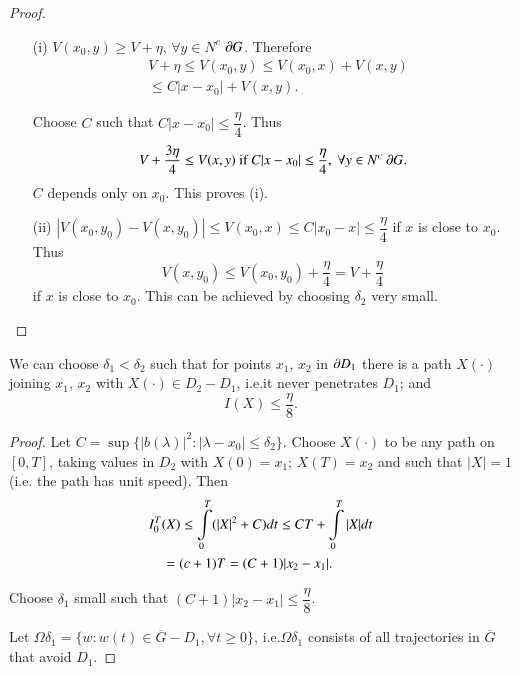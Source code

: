 \begin{proof}
\begin{itemize}
\item[\rm(i)] $V(x_{0},y)\geq V+\eta$, $\forall y\in N^{c}$ $\partial
  G$. Therefore
\begin{align*}
& V+\eta\leq V(x_{0},y)\leq V(x_{0},x)+V(x,y)\\
& \leq C|x-x_{0}|+V(x,y).
\end{align*}

Choose $C$ such that $C|x-x_{0}|\leq \dfrac{\eta}{4}$. Thus
$$
V+\frac{3\eta}{4}\leq V(x,y)\text{~ if~ } C|x-x_{0}|\leq
\frac{\eta}{4},\ \forall y\in N^{c}\ \partial G.
$$\pageoriginale
$C$ depends only on $x_{0}$. This proves (i).


\item[(ii)] $|V(x_{0},y_{0})-V(x,y_{0})|\leq V(x_{0},x)\leq
  C|x_{0}-x|\leq \dfrac{\eta}{4}$ if $x$ is close to $x_{0}$. Thus
$$
V(x,y_{0})\leq V(x_{0},y_{0})+\frac{\eta}{4}=V+\frac{\eta}{4}
$$
if $x$ is close to $x_{0}$. This can be achieved by choosing
$\delta_{2}$ very small.
\end{itemize}
\end{proof}

\begin{claim*}[(iii)]
We can choose $\delta_{1}<\delta_{2}$ such that for
  points $x_{1}$, $x_{2}$ in $\partial D_{1}$ there is a path $X(\cdot)$
  joining $x_{1}$, $x_{2}$ with $X(\cdot)\in D_{2}-D_{1}$, i.e.\@ it
  never penetrates $D_{1}$; and
$$
I(X)\leq \frac{\eta}{8}.
$$
\end{claim*}

\begin{proof}
Let $C=\sup \{|b(\lambda)|^{2}:|\lambda-x_{0}|\leq
\delta_{2}\}$. Choose $X(\cdot)$ to be any path on $[0,T]$, taking
values in $D_{2}$ with $X(0)=x_{1}$; $X(T)=x_{2}$ and such that
$|X|=1$ (i.e. the path has unit speed). Then
\begin{align*}
& I^{T}_{0}(X)\leq \int\limits^{T}_{0}(|X|^{2}+C)dt\leq
  CT+\int\limits^{T}_{0}|X|dt\\
&\quad =(c+1)T=(C+1)|x_{2}-x_{1}|.
\end{align*}

Choose $\delta_{1}$ small such that $(C+1)|x_{2}-x_{1}|\leq
\dfrac{\eta}{8}$.

Let $\Omega\delta_{1}=\{w:w(t)\in \overline{G}-D_{1},\forall t\geq
0\}$, i.e.\@ $\Omega\delta_{1}$ consists of all trajectories in
$\overline{G}$ that avoid $D_{1}$.
\end{proof}

